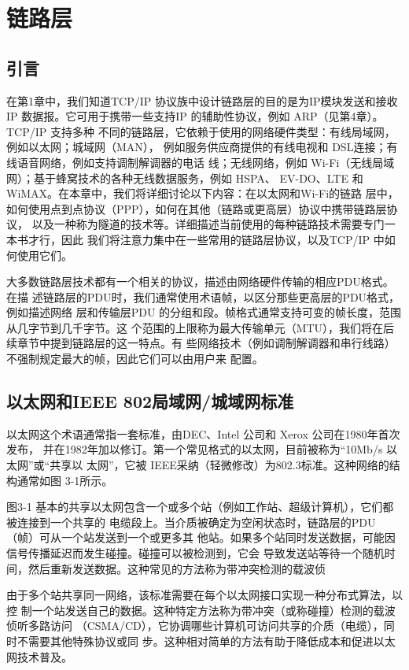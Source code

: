 \chapter{链路层}
\minitoc

\section{引言}

在第1章中，我们知道TCP/IP 协议族中设计链路层的目的是为IP模块发送和接收IP
数据报。它可用于携带一些支持IP 的辅助性协议，例如 ARP（见第4章）。TCP/IP 支持多种
不同的链路层，它依赖于使用的网络硬件类型：有线局域网，例如以太网；城域网（MAN），
例如服务供应商提供的有线电视和 DSL连接；有线语音网络，例如支持调制解调器的电话
线；无线网络，例如 Wi-Fi（无线局域网）；基于蜂窝技术的各种无线数据服务，例如 HSPA、
EV-DO、LTE 和 WiMAX。在本章中，我们将详细讨论以下内容：在以太网和Wi-Fi的链路
层中，如何使用点到点协议（PPP），如何在其他（链路或更高层）协议中携带链路层协议，
以及一种称为隧道的技术等。详细描述当前使用的每种链路技术需要专门一本书才行，因此
我们将注意力集中在一些常用的链路层协议，以及TCP/IP 中如何使用它们。

大多数链路层技术都有一个相关的协议，描述由网络硬件传输的相应PDU格式。在描
述链路层的PDU时，我们通常使用术语帧，以区分那些更高层的PDU格式，例如描述网络
层和传输层PDU 的分组和段。帧格式通常支持可变的帧长度，范围从几字节到几千字节。这
个范围的上限称为最大传输单元（MTU），我们将在后续章节中提到链路层的这一特点。有
些网络技术（例如调制解调器和串行线路）不强制规定最大的帧，因此它们可以由用户来
配置。

\section{以太网和IEEE 802局域网/城域网标准}

以太网这个术语通常指一套标准，由DEC、Intel 公司和 Xerox 公司在1980年首次发布，
并在1982年加以修订。第一个常见格式的以太网，目前被称为“10Mb/s 以太网”或“共享以
太网”，它被 IEEE采纳（轻微修改）为802.3标准。这种网络的结构通常如图 3-1所示。

图3-1 基本的共享以太网包含一个或多个站（例如工作站、超级计算机），它们都被连接到一个共享的
电缆段上。当介质被确定为空闲状态时，链路层的PDU（帧）可从一个站发送到一个或更多其
他站。如果多个站同时发送数据，可能因信号传播延迟而发生碰撞。碰撞可以被检测到，它会
导致发送站等待一个随机时间，然后重新发送数据。这种常见的方法称为带冲突检测的载波侦

由于多个站共享同一网络，该标准需要在每个以太网接口实现一种分布式算法，以控
制一个站发送自己的数据。这种特定方法称为带冲突（或称碰撞）检测的载波侦听多路访问
（CSMA/CD），它协调哪些计算机可访问共享的介质（电缆），同时不需要其他特殊协议或同
步。这种相对简单的方法有助于降低成本和促进以太网技术普及。

